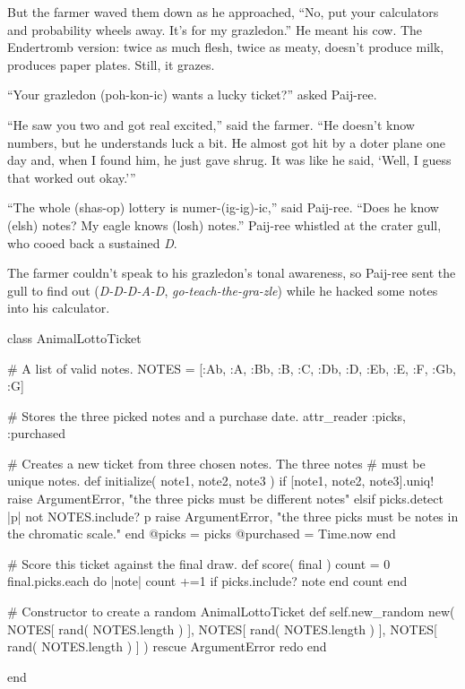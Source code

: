 \documentclass[12pt,twoside]{report}
\begin{document}
But the farmer waved them down as he approached, ``No, put your
calculators and probability wheels away.  It's for my grazledon.''  He
meant his cow.  The Endertromb version: twice as much flesh, twice as
meaty, doesn't produce milk, produces paper plates.  Still, it grazes.

``Your grazledon (poh-kon-ic) wants a lucky ticket?'' asked Paij-ree.

``He saw you two and got real excited,'' said the farmer.  ``He
doesn't know numbers, but he understands luck a bit.  He almost got
hit by a doter plane one day and, when I found him, he just gave
shrug.  It was like he said, `Well, I guess that worked out okay.'''

``The whole (shas-op) lottery is numer-(ig-ig)-ic,'' said Paij-ree.
``Does he know (elsh) notes?  My eagle knows (losh) notes.''  Paij-ree
whistled at the crater gull, who cooed back a sustained {\em D}.

The farmer couldn't speak to his grazledon's tonal awareness, so
Paij-ree sent the gull to find out ({\em D-D-D-A-D}, {\em
  go-teach-the-gra-zle}) while he hacked some notes into his
calculator.


\begin{rubycode}

 class AnimalLottoTicket

   # A list of valid notes.
   NOTES = [:Ab, :A, :Bb, :B, :C, :Db, :D, :Eb, :E, :F, :Gb, :G]

   # Stores the three picked notes and a purchase date.
   attr_reader :picks, :purchased

   # Creates a new ticket from three chosen notes.  The three notes
   # must be unique notes.
   def initialize( note1, note2, note3 )
     if [note1, note2, note3].uniq!
       raise ArgumentError, "the three picks must be different notes"
     elsif picks.detect { |p| not NOTES.include? p }
       raise ArgumentError, "the three picks must be notes in the chromatic scale."
     end
     @picks = picks
     @purchased = Time.now
   end

   # Score this ticket against the final draw.
   def score( final )
     count = 0
     final.picks.each do |note|
       count +=1 if picks.include? note
     end
     count
   end

   # Constructor to create a random AnimalLottoTicket
   def self.new_random
     new( NOTES[ rand( NOTES.length ) ], NOTES[ rand( NOTES.length ) ],
          NOTES[ rand( NOTES.length ) ] )
   rescue ArgumentError
     redo
   end

 end

\end{rubycode}
\end{document}

